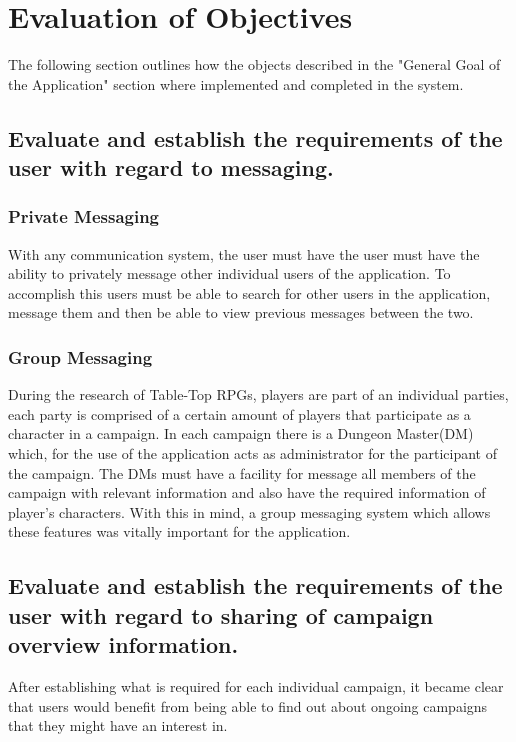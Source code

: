 \section{Evaluation of Objectives}
The following section outlines how the objects described in the "General Goal of the Application" section where implemented and completed in the system.

\subsection{Evaluate and establish the requirements of the user with regard to messaging.}
\subsubsection{Private Messaging}
With any communication system, the user must have the user must have the ability to privately message other individual users of the application.  To accomplish this users must be able to search for other users in the application, message them and then be able to view previous messages between the two.

\subsubsection{Group Messaging}
During the research of Table-Top RPGs, players are part of an individual parties, each party is comprised of a certain amount of players that participate as a character in a campaign.  In each campaign there is a Dungeon Master(DM) which, for the use of the application acts as administrator for the participant of the campaign.  The DMs must have a facility for message all members of the campaign with relevant information and also have the required information of player's characters.  With this in mind, a group messaging system which allows these features was vitally important for the application.

\subsection{Evaluate and establish the requirements of the user with regard to sharing of campaign overview information.}
After establishing what is required for each individual campaign, it became clear that users would benefit from being able to find out about ongoing campaigns that they might have an interest in.

